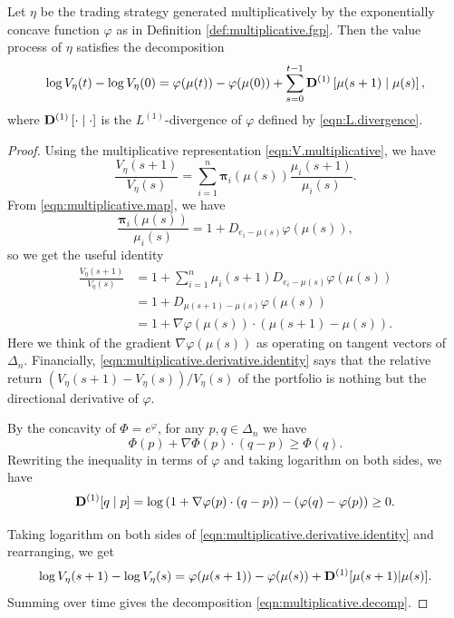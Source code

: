 \documentclass[graybox]{svmult}
\begin{document}
\begin{theorem}  \cite{F99, PW15} \label{thm:fernholz}
Let $\eta$ be the trading strategy generated multiplicatively by the exponentially concave function $\varphi$ as in Definition \ref{def:multiplicative.fgp}. Then the value process of $\eta$ satisfies the decomposition
\begin{equation} \label{eqn:multiplicative.decomp}
\log V_{\eta}(t) - \log V_{\eta}(0) = \varphi(\mu(t)) - \varphi(\mu(0)) + \sum_{s = 0}^{t - 1} {\bf D}^{(1)} \left[ \mu(s + 1) \mid \mu(s)\right],
\end{equation}
where ${\bf D}^{(1)}\left[ \cdot \mid \cdot\right]$ is the $L^{(1)}$-divergence of $\varphi$ defined by \eqref{eqn:L.divergence}.
\end{theorem}
\begin{proof}
Using the multiplicative representation \eqref{eqn:V.multiplicative}, we have
\[
\frac{V_{\eta}(s + 1)}{V_{\eta}(s)} = \sum_{i = 1}^n \boldsymbol{\pi}_i(\mu(s)) \frac{\mu_i(s + 1)}{\mu_i(s)}.
\]
From \eqref{eqn:multiplicative.map}, we have
\[
\frac{\boldsymbol{\pi}_i(\mu(s))}{\mu_i(s)} = 1 + D_{e_i - \mu(s)} \varphi(\mu(s)),
\]
so we get the useful identity
\begin{equation} \label{eqn:multiplicative.derivative.identity}
\begin{split}
\frac{V_{\eta}(s + 1)}{V_{\eta}(s)} &= 1 + \sum_{i = 1}^n \mu_i(s + 1) D_{e_i - \mu(s)} \varphi(\mu(s))\\
&= 1 + D_{\mu(s + 1) - \mu(s)} \varphi(\mu(s)) \\
 &= 1 + \nabla \varphi(\mu(s)) \cdot (\mu(s + 1) - \mu(s)).
\end{split}
\end{equation}
Here we think of the gradient $\nabla \varphi(\mu(s))$ as operating on tangent vectors of $\Delta_n$. Financially, \eqref{eqn:multiplicative.derivative.identity} says that the relative return $(V_{\eta}(s + 1) - V_{\eta}(s))/V_{\eta}(s)$ of the portfolio is nothing but the directional derivative of $\varphi$.

By the concavity of $\Phi = e^{\varphi}$, for any $p, q \in \Delta_n$ we have
\[
\Phi(p) + \nabla \Phi(p) \cdot (q - p) \geq \Phi(q).
\]
Rewriting the inequality in terms of $\varphi$ and taking logarithm on both sides, we have
\[
{\bf D}^{(1)}[q \mid p] = \log \left( 1 + \nabla \varphi(p) \cdot (q - p) \right) - \left( \varphi(q) - \varphi(p) \right) \geq 0.
\]

Taking logarithm on both sides of \eqref{eqn:multiplicative.derivative.identity} and rearranging, we get
\[
\log V_{\eta}(s + 1) - \log V_{\eta}(s) = \varphi(\mu(s + 1)) - \varphi(\mu(s)) + {\bf D}^{(1)}[ \mu(s + 1) | \mu(s)].
\]
Summing over time gives the decomposition \eqref{eqn:multiplicative.decomp}.
\end{proof}
\end{document}
